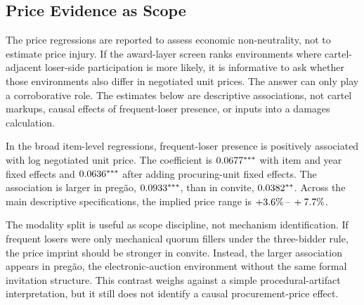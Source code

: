 \subsection{Price Evidence as Scope}
\label{sec:price_imprint_submission}

The price regressions are reported to assess economic
non-neutrality, not to estimate price injury. If the award-layer
screen ranks environments where cartel-adjacent loser-side
participation is more likely, it is informative to ask whether
those environments also differ in negotiated unit prices. The
answer can only play a corroborative role. The estimates below
are descriptive associations, not cartel markups, causal effects
of frequent-loser presence, or inputs into a damages calculation.

In the broad item-level regressions, frequent-loser presence is
positively associated with log negotiated unit price. The
coefficient is $0.0677^{***}$ with item and year fixed
effects and $0.0636^{***}$ after adding procuring-unit
fixed effects. The association is larger in pregão,
$0.0933^{***}$, than in convite, $0.0382^{**}$.
Across the main descriptive specifications, the implied price
range is $+3.6\%\,\text{--}\,+7.7\%$.

The modality split is useful as scope discipline, not mechanism
identification. If frequent losers were only mechanical quorum
fillers under the three-bidder rule, the price imprint should be
stronger in convite. Instead, the larger association appears in
pregão, the electronic-auction environment without the same formal
invitation structure. This contrast weighs against a simple
procedural-artifact interpretation, but it still does not identify
a causal procurement-price effect.

